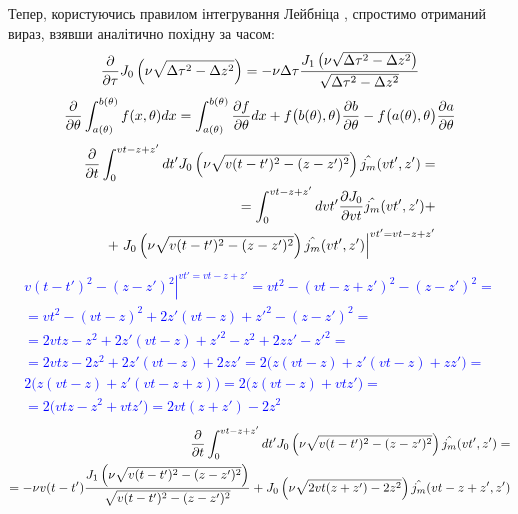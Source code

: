 Тепер, користуючись правилом інтегрування Лейбніца \cite{imp:NumRecipes2007}, 
спростимо отриманий вираз, взявши аналітично похідну за часом:
%
\textcolor{blue} { \begin{equation*} \begin{aligned}
\frac{\partial }{\partial \tau} 
J_0 \left( \nu \sqrt{\Delta \tau^2 - \Delta z^2} \right) = 
- \nu \Delta \tau 
\frac{J_1 \left( \nu \sqrt{\Delta \tau^2 - \Delta z^2} \right)}
{\sqrt{\Delta \tau^2 - \Delta z^2}}
\end{aligned} \end{equation*} }
%
\textcolor{blue} { \begin{equation*} \begin{aligned}
\frac{\partial }{\partial \theta} \int_{a(\theta)}^{b(\theta)} f(x,\theta) dx = 
\int_{a(\theta)}^{b(\theta)} \frac{\partial f}{\partial \theta} dx + 
f\big( b(\theta), \theta \big) \frac{\partial b}{\partial \theta} -
f\big( a(\theta), \theta \big) \frac{\partial a}{\partial \theta}
\end{aligned} \end{equation*} }
%
\textcolor{blue} { \begin{equation*} \begin{aligned}
\frac{\partial }{\partial t} \int_0^{vt - z + z'} dt'
J_0 \left( \nu \sqrt{v(t-t')^2 - (z-z')^2} \right) \hat{j_m} (vt',z') = \\
= \int_0^{vt - z + z'} dvt' \frac{\partial J_0}{\partial vt} \hat{j_m} (vt',z') + \\
+ \left. 
J_0 \left( \nu \sqrt{v(t-t')^2 - (z-z')^2} \right) \hat{j_m} (vt',z')
\right|^{vt' = vt - z + z'}
\end{aligned} \end{equation*} }
%
\textcolor{blue} { \begin{equation*} \begin{aligned}
\left. v(t-t')^2 - (z-z')^2 \right|^{vt' = vt - z + z'} = 
vt^2 - (vt - z + z')^2 - (z-z')^2 = \\
= vt^2 - (vt - z)^2 + 2 z' (vt - z) + z'^2 - (z-z')^2 = \\
= 2 vt z - z^2 + 2 z' (vt - z) + z'^2 - z^2 + 2 z z' - z'^2 = \\
= 2 vt z - 2 z^2 + 2 z' (vt - z) + 2 z z' = 
2 \big( z (vt - z) + z' (vt - z) + z z' \big) = \\
2 \big( z (vt - z) + z' (vt - z + z) \big) = 
2 \big( z (vt - z) + vt z' \big) = \\
= 2 \big( vt z - z^2 + vt z' \big) = 2 vt (z + z') - 2 z^2
\end{aligned} \end{equation*} }
%
\textcolor{blue} { \begin{equation*} \begin{aligned}
\partder{}{t} \int_0^{vt - z + z'} dt'
J_0 \left( \nu \sqrt{v(t-t')^2 - (z-z')^2} \right) \hat{j_m} (vt',z') = \\
= - \nu v (t-t') 
\frac{J_1 \left( \nu \sqrt{v(t-t')^2 - (z-z')^2} \right)}
{\sqrt{v(t-t')^2 - (z-z')^2}} %
+ J_0 \left( \nu \sqrt{2 vt (z + z') - 2 z^2} \right) 
\hat{j_m} (vt - z + z',z')
\end{aligned} \end{equation*} }
